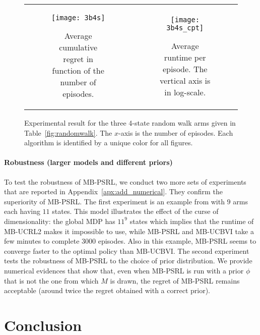 \begin{figure}[ht]
    \begin{tabular}{cc}
        \begin{subfigure}[t]{0.47\linewidth}
            \texttt{[image: 3b4s]} 
            \caption{Average cumulative regret in function of the number of episodes.}
            \label{fig:randomwalk_3b4s}
        \end{subfigure}&
        \begin{subfigure}[t]{0.47\linewidth}
            \texttt{[image: 3b4s\_cpt]}
            \caption{Average runtime per episode. The vertical axis is in log-scale.}
            \label{fig:randomwalk_cpt_3b4s}
    \end{subfigure}
    \end{tabular}
    \caption{Experimental result for the three 4-state random walk arms given in Table~\ref{fig:randomwalk}. The $x$-axis is the number of episodes. Each algorithm is identified by a unique color for all figures.}
\end{figure}

\paragraph{Robustness (larger models and different priors)}
To test the robustness of MB-PSRL, we conduct two more sets of experiments that are reported in Appendix~\ref{apx:add_numerical}. They confirm the superiority of MB-PSRL.
The first experiment is an example from \cite{duff1995q} with $9$ arms each having $11$ states. This model illustrates the effect of the curse of dimensionality: the global  MDP has $11^9$ states which implies that the runtime of MB-UCRL2 makes it impossible to use, while MB-PSRL and MB-UCBVI take a few minutes to complete 3000 episodes.  Also in this example, MB-PSRL seems to converge faster to the optimal policy than MB-UCBVI. The second experiment tests the robustness of MB-PSRL to the choice of prior distribution. We provide numerical evidences that show that, even when MB-PSRL is run with a prior $\phi$ that is not the one from which $M$ is drawn, the regret of MB-PSRL remains acceptable (around twice the regret obtained with a correct prior). 


\section{Conclusion}
\label{ch:rested:sec:conclusion}

